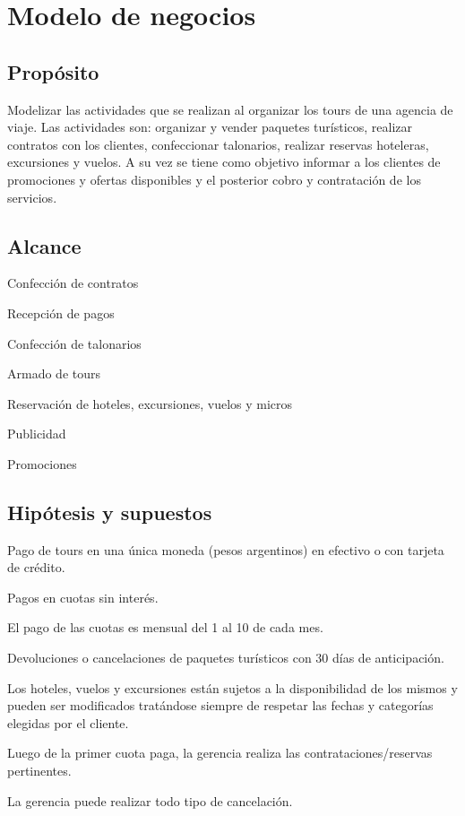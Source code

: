 \documentclass[12pt,a4paper,titlepage,oneside]{article}
\renewenvironment{itemize}{
 \begin{list}{}{
  \setlength{\leftmargin}{1.5em}
 }
}{
 \end{list}
}
\begin{document}
\section{Modelo de negocios}

\subsection{Propósito}
Modelizar las actividades que se realizan al organizar los tours de una agencia de viaje. 
Las actividades son: organizar y vender paquetes turísticos, realizar contratos con los clientes, confeccionar talonarios, realizar reservas hoteleras, excursiones  y vuelos. A su vez se tiene como objetivo informar a los clientes de promociones y ofertas disponibles y el posterior cobro y contratación de los servicios.


\subsection{Alcance}

\begin{itemize}
\item[•] Confección de contratos
\item[•] Recepción de pagos
\item[•] Confección de talonarios
\item[•] Armado de tours
\item[•] Reservación de hoteles, excursiones, vuelos y micros
\item[•] Publicidad
\item[•] Promociones
\end{itemize}



\subsection{Hipótesis y supuestos}

\begin{itemize}
\item[•] Pago de tours en una única moneda (pesos argentinos) en efectivo o con tarjeta de crédito.
\item[•] Pagos en cuotas sin interés.
\item[•] El pago de las cuotas es mensual del 1 al 10 de cada mes.
\item[•] Devoluciones o cancelaciones de paquetes turísticos con 30 días de anticipación.
\item[•] Los hoteles, vuelos y excursiones están sujetos a la disponibilidad de los mismos y pueden ser modificados  tratándose siempre de respetar las fechas y categorías elegidas por el cliente.
\item[•] Luego de la primer cuota paga, la gerencia realiza las contrataciones/reservas pertinentes.
\item[•] La gerencia puede realizar todo tipo de cancelación.
\end{itemize}
\end{document}

